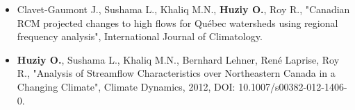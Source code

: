 \vspace{\vertspace}


{
\renewcommand{\labelitemi}{}
\begin{itemize}

    \item Clavet-Gaumont J., Sushama L., Khaliq M.N.,
    \textbf{Huziy O.}, Roy R., "Canadian RCM projected changes to high
    flows for Québec watersheds using regional frequency analysis", International Journal of Climatology.

    \item \textbf{Huziy O.}, Sushama L., Khaliq M.N., Bernhard
    Lehner, René Laprise, Roy R., "Analysis of Streamflow Characteristics over Northeastern Canada
     in a Changing Climate", Climate Dynamics, 2012, DOI:
     10.1007/s00382-012-1406-0.

\end{itemize}
}
